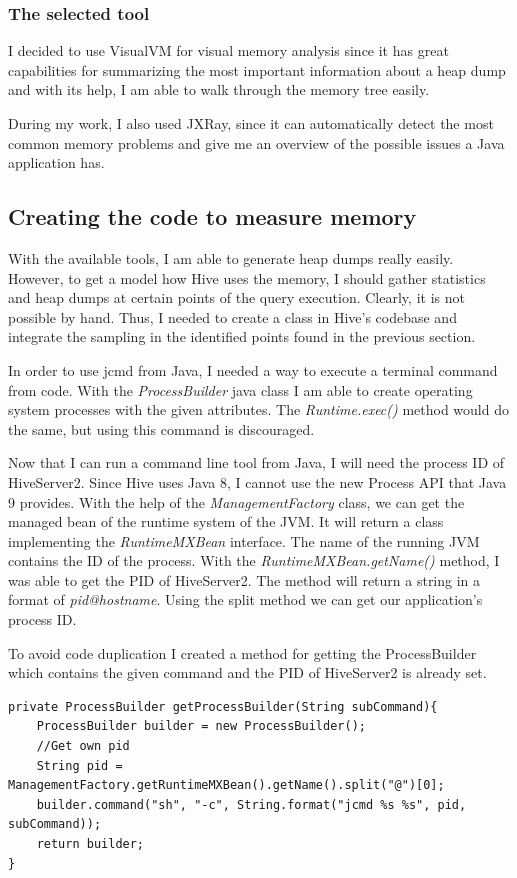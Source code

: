 \subsubsection{The selected tool}
I decided to use VisualVM for visual memory analysis since it has great capabilities for summarizing the most important information about a heap dump and with its help, I am able to walk through the memory tree easily.

During my work, I also used JXRay, since it can automatically detect the most common memory problems and give me an overview of the possible issues a Java application has.

\clearpage
\subsection{Creating the code to measure memory}
With the available tools, I am able to generate heap dumps really easily. However, to get a model how Hive uses the memory, I should gather statistics and heap dumps at certain points of the query execution. Clearly, it is not possible by hand. Thus, I needed to create a class in Hive's codebase and integrate the sampling in the identified points found in the previous section.

In order to use jcmd from Java, I needed a way to execute a terminal command from code. With the \textit{ProcessBuilder} java class I am able to create operating system processes with the given attributes. The \textit{Runtime.exec()} method would do the same, but using this command is discouraged. 

Now that I can run a command line tool from Java, I will need the process ID of HiveServer2. Since Hive uses Java 8, I cannot use the new Process API that Java 9 provides. With the help of the \textit{ManagementFactory} class, we can get the managed bean of the runtime system of the JVM. It will return a class implementing the \textit{RuntimeMXBean} interface. The name of the running JVM contains the ID of the process. With the \textit{RuntimeMXBean.getName()} method, I was able to get the PID of HiveServer2. The method will return a string in a format of \textit{pid@hostname}. Using the split method we can get our application's process ID.

To avoid code duplication I created a method for getting the ProcessBuilder which contains the given command and the PID of HiveServer2 is already set.

\begin{lstlisting}
private ProcessBuilder getProcessBuilder(String subCommand){
	ProcessBuilder builder = new ProcessBuilder();
	//Get own pid
	String pid = ManagementFactory.getRuntimeMXBean().getName().split("@")[0];
	builder.command("sh", "-c", String.format("jcmd %s %s", pid, subCommand));
	return builder;
}
\end{lstlisting}

